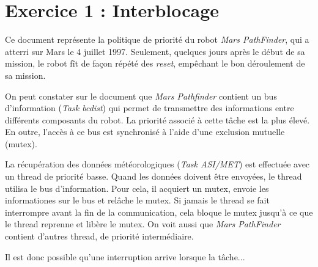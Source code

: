 \documentclass[a4paper]{article}
\begin{document}
\section{Exercice 1 : Interblocage}

Ce document représente la politique de priorité du robot \textit{Mars PathFinder}, qui a atterri sur Mars le 4 juillet 1997. Seulement, quelques jours après le début de sa mission, le robot fît de façon répété des \textit{reset}, empêchant le bon déroulement de sa mission.

On peut constater sur le document que \textit{Mars Pathfinder} contient un bus d'information (\textit{Task bcdist}) qui permet de transmettre des informations entre différents composants du robot. La priorité associé à cette tâche est la plus élevé. En outre, l'accès à ce bus est synchronisé à l'aide d'une exclusion mutuelle (mutex).

La récupération des données météorologiques (\textit{Task ASI/MET}) est effectuée avec un thread de priorité basse. Quand les données doivent être envoyées, le thread utilisa le bus d'information. Pour cela, il acquiert un mutex, envoie les informationes sur le bus et relâche le mutex. Si jamais le thread se fait interrompre avant la fin de la communication, cela bloque le mutex jusqu'à ce que le thread reprenne et libère le mutex. On voit aussi que \textit{Mars PathFinder} contient d'autres thread, de priorité intermédiaire.

Il est donc possible qu'une interruption arrive lorsque la tâche...
\end{document}
